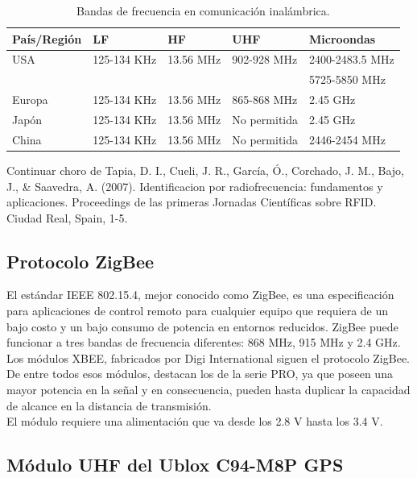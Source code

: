 \begin{table}[!htb]
\begin{center}
\caption{Bandas de frecuencia en comunicación inalámbrica.}
\begin{tabular}{|l|l|l|l|l|}
	\hline
	\textbf{País/Región} & \textbf{LF} & \textbf{HF} & \textbf{UHF} & \textbf{Microondas}\\
	\hline
	USA & 125-134 KHz & 13.56 MHz & 902-928 MHz & 2400-2483.5 MHz\\& & & & 5725-5850 MHz \\
	\hline
	Europa & 125-134 KHz & 13.56 MHz & 865-868 MHz & 2.45 GHz \\
	\hline
	Japón & 125-134 KHz & 13.56 MHz & No permitida & 2.45 GHz \\
	\hline
	China & 125-134 KHz & 13.56 MHz & No permitida & 2446-2454 MHz \\
	\hline
\end{tabular}
\end{center}
\end{table}

Continuar choro de Tapia, D. I., Cueli, J. R., García, Ó., Corchado, J. M., Bajo, J., \& Saavedra, A. (2007). Identificacion por radiofrecuencia: fundamentos y aplicaciones. Proceedings de las primeras Jornadas Científicas sobre RFID. Ciudad Real, Spain, 1-5.

\subsection{Protocolo ZigBee}

El estándar IEEE 802.15.4, mejor conocido como ZigBee, es una especificación para aplicaciones de control remoto para cualquier equipo que requiera de un bajo costo y un bajo consumo de potencia en entornos reducidos. ZigBee puede funcionar a tres bandas de frecuencia diferentes: 868 MHz, 915 MHz y 2.4 GHz. \\

Los módulos XBEE, fabricados por Digi International siguen el protocolo ZigBee. De entre todos esos módulos, destacan los de la serie PRO, ya que poseen una mayor potencia en la señal y en consecuencia, pueden hasta duplicar la capacidad de alcance en la distancia de transmisión. \\

El módulo requiere una alimentación que va desde los 2.8 V hasta los 3.4 V.

\subsection{Módulo UHF del Ublox C94-M8P GPS}

